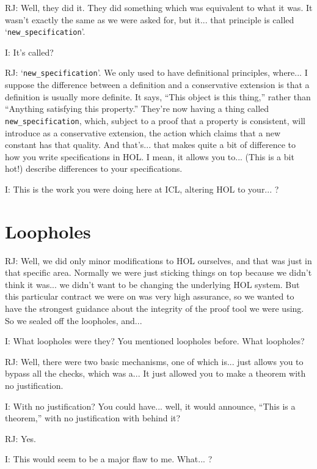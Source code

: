 \documentclass[10pt,titlepage]{book}
\begin{document}
RJ: Well, they did it.
They did something which was equivalent to what it was.
It wasn't exactly the same as we were asked for, but it... that principle is called `{\tt new\_specification}'.

I: It's called?

RJ: `{\tt new\_specification}'.
We only used to have definitional principles, where... I suppose the difference between a definition and a conservative extension is that a definition is usually more definite.
It says, ``This object is this thing,'' rather than ``Anything satisfying this property.''
They're now having a thing called {\tt new\_specification}, which, subject to a proof that a property is consistent, will introduce as a conservative extension, the action which claims that a new constant has that quality.
And that's... that makes quite a bit of difference to how you write specifications in HOL. I mean, it allows you to... (This is a bit hot!) describe differences to your specifications.

I: This is the work you were doing here at ICL, altering HOL to your... ?

\section{Loopholes}

RJ: Well, we did only minor modifications to HOL ourselves, and that was just in that specific area. Normally we were just sticking things on top because we didn't think it was... we didn't want to be changing the underlying HOL system. But this particular contract we were on was very high assurance, so we wanted to have the strongest guidance about the integrity of the proof tool we were using. So we sealed off the loopholes, and... 

I: What loopholes were they? You mentioned loopholes before. What loopholes?

RJ: Well, there were two basic mechanisms, one of which is... just allows you to bypass all the checks, which was a... 
It just allowed you to make a theorem with no justification.

I: With no justification?
You could have... well, it would announce, ``This is a theorem,'' with no justification with behind it?

RJ: Yes.

I: This would seem to be a major flaw to me. What... ?
\end{document}
